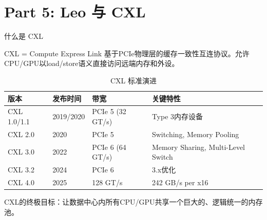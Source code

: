 \documentclass[UTF8,11pt,aspectratio=169]{beamer}
\begin{document}
\section{Part 5: Leo 与 CXL}

\begin{frame}{什么是 CXL}
    \begin{block}{CXL = Compute Express Link}
        基于PCIe物理层的\alert{缓存一致性}互连协议。允许CPU/GPU以load/store语义直接访问远端内存和外设。
    \end{block}

    \begin{table}
        \caption{CXL 标准演进}
        \begin{tabular}{llll}
            \toprule
            \textbf{版本} & \textbf{发布时间} & \textbf{带宽} & \textbf{关键特性} \\
            \midrule
            CXL 1.0/1.1 & 2019/2020 & PCIe 5 (32 GT/s) & Type 3内存设备 \\
            CXL 2.0 & 2020 & PCIe 5 & Switching, Memory Pooling \\
            CXL 3.0 & 2022 & PCIe 6 (64 GT/s) & Memory Sharing, Multi-Level Switch \\
            CXL 3.2 & 2024 & PCIe 6 & 3.x优化 \\
            CXL 4.0 & 2025 & 128 GT/s & 242 GB/s per x16 \\
            \bottomrule
        \end{tabular}
    \end{table}

    \begin{keypoint}
        CXL的终极目标：让数据中心内所有CPU/GPU共享一个巨大的、逻辑统一的内存池。
    \end{keypoint}
\end{frame}

\end{document}
